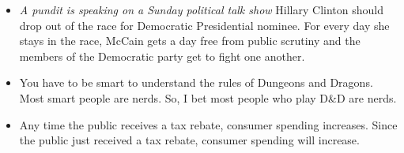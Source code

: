 \begin{itemize}


\item \textit{A pundit is speaking on a Sunday political talk show} Hillary Clinton should drop out of the race for Democratic Presidential nominee. For every day she stays in the race, McCain gets a day free from public scrutiny and the members of the Democratic party get to fight one another. %



\item You have to be smart to understand the rules of Dungeons and Dragons. Most smart people are nerds. So, I bet most people who play D\&D are nerds. %



\item Any time the public receives a tax rebate, consumer spending increases. Since the public just received a tax rebate, consumer spending will increase. %





\end{itemize}
